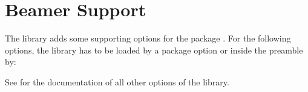 \clearpage
\section{Beamer Support}\label{sec:beamer}%
%
The  library adds some supporting options for the 
package \cite{tantau:beamer}.
For the following options, the  library has to be loaded
by a package option or inside the preamble by:
\begin{dispListing}
\end{dispListing}

See  for the documentation of all other options of the  library.

